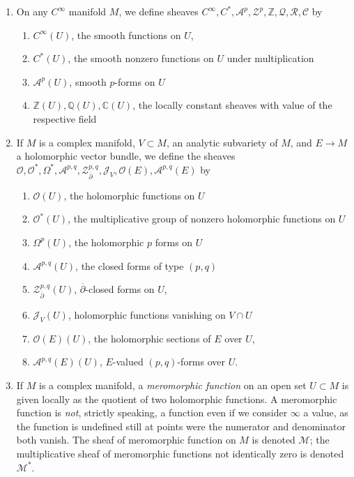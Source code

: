 \begin{enumerate}
\item On any $ C^{\infty} $ manifold $M$, we define sheaves $ C^{\infty} , C^*, \mathcal{A}^p, \mathcal{Z}^p, \mathbb{Z}, \mathcal{Q}, \mathcal{R}, \mathcal{C}$ by

	\begin{enumerate}
	\item $ C^{\infty}( U ) $, the smooth functions on $U$,
	\item $ C^*(U)$, the smooth nonzero functions on $U$ under multiplication
	\item $ \mathcal{A}^p(U)$, smooth $p$-forms on $U$
	\item $ \mathbb{Z}(U), \mathbb{Q}(U), \mathbb{C}(U)$, the locally constant sheaves with value of the respective field
	\end{enumerate}

\item If $M$ is a complex manifold, $V \subset M$, an analytic subvariety of $M$, and $ E \to M$ a holomorphic vector bundle, we define the sheaves $ \mathcal{O}, \mathcal{O}^*, \Omega^*, \mathcal{A}^{p,q}, \mathcal{Z}^{p,q}_{ \overline{\partial} }, \mathcal{J}_V, \mathcal{O}(E), \mathcal{A}^{p,q}(E)$ by 
	\begin{enumerate}
		\item $ \mathcal{O}(U)$, the holomorphic functions on $U$
		\item $ \mathcal{O}^*(U)$, the multiplicative group of nonzero holomorphic functions on $U$
		\item $\Omega^p(U)$, the holomorphic $p$ forms on $U$
		\item $ \mathcal{A}^{p,q}(U)$, the closed forms of type $(p,q)$
		\item $ \mathcal{Z}^{p,q}_{ \overline{\partial} } (U)$, $ \overline{\partial}$-closed forms on $U$,
		\item $ \mathcal{J}_V(U)$, holomorphic functions vanishing on $V \cap U$

		\item $ \mathcal{O}(E)(U)$, the holomorphic sections of $E$ over $U$,
		\item $ \mathcal{A}^{p,q}(E)(U)$, $E$-valued $(p,q)$-forms over $U$.
	\end{enumerate}

\item If $M$ is a complex manifold, a \textit{meromorphic function} on an open set $U \subset M$ is given locally as the quotient of two holomorphic functions. A meromorphic function is \textit{not}, strictly speaking, a function even if we consider $\infty$ a value, as the function is undefined still at points were the numerator and denominator both vanish. The sheaf of meromorphic function on $M$ is denoted $ \mathcal{M}$; the multiplicative sheaf of meromorphic functions not identically zero is denoted $ \mathcal{M}^*$.
\end{enumerate}

